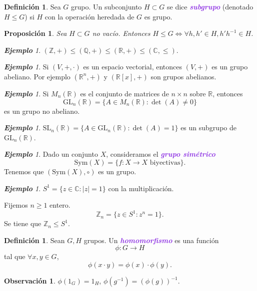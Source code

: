 \documentclass{article}
\newtheorem{proposition}[theorem]{Proposición}
\theoremstyle{definition}
\newtheorem{definition}[theorem]{Definición}
\newtheorem*{obs}{Observación}
\theoremstyle{remark}
\newtheorem{example}[theorem]{\textbf{Ejemplo}}
\numberwithin{equation}{section}
\newcommand{\C}{\mathbb{C}}
\newcommand{\Q}{\mathbb{Q}}
\newcommand{\R}{\mathbb{R}}
\newcommand{\Z}{\mathbb{Z}}
\renewcommand{\c}{\cdot}
\newcommand{\GL}{\mathrm{GL}}
\newcommand{\SL}{\mathrm{SL}}
\newcommand{\Sym}{\mathrm{Sym}}
\newcommand{\wea}[1]{\textcolor{BlueViolet}{\textbf{\emph{#1}}}}
\begin{document}
\begin{definition}
  Sea $G$ grupo. Un subconjunto $H \subset G$ se dice \wea{subgrupo} (denotado $H \leqslant G$) si $H$ con la operación heredada de $G$ es grupo.
\end{definition}

\begin{proposition}
  Sea $H \subset G$ no vacío. Entonces $H \leqslant G \iff \forall h,h' \in H, h'h^{-1} \in H$.
\end{proposition}

\begin{example}
  $(\Z,+) \leqslant (\Q,+) \leqslant (\R,+) \leqslant (\C,\leqslant)$.
\end{example}

\begin{example}
  Si $(V,+,\cdot)$ es un espacio vectorial, entonces $(V,+)$ es un grupo abeliano. Por ejemplo $(\R^n,+)$ y $(\R[x],+)$ son grupos abelianos.
\end{example}

\begin{example}
  Si $M_n(\R)$ es el conjunto de matrices de $n \times n$ sobre $\R$, entonces
  \[\GL_n(\R) = \{A \in M_n(\R) : \det(A) \neq 0\}\]
  es un grupo no abeliano.
\end{example}

\begin{example}
  $\SL_n(\R) = \{A \in \GL_n(\R) : \det(A) = 1\}$ es un subgrupo de $\GL_n(\R)$.
\end{example}

\begin{example}
  Dado un conjunto $X$, consideramos el \wea{grupo simétrico}
  \[\Sym(X) = \{f \colon X \to X \text{ biyectivas}\}.\]
  Tenemos que $(\Sym(X),\circ)$ es un grupo.
\end{example}

\begin{example}
  $S^1 = \{z \in \C : |z| = 1\}$ con la multiplicación.

  Fijemos $n \geq 1$ entero.
  \[\Z_n = \{z \in S^1 : z^n = 1\}.\]
  Se tiene que $\Z_n \leqslant S^1$.
\end{example}

\begin{definition}
  Sean $G,H$ grupos. Un \wea{homomorfismo} es una función $$\phi \colon G \to H$$ tal que $\forall x, y \in G$, $$\phi(x\c y) = \phi(x) \c \phi(y).$$
\end{definition}

\begin{obs}
  $\phi(1_G) = 1_H$, $\phi(g^{-1}) = (\phi(g))^{-1}$.
\end{obs}
\end{document}
